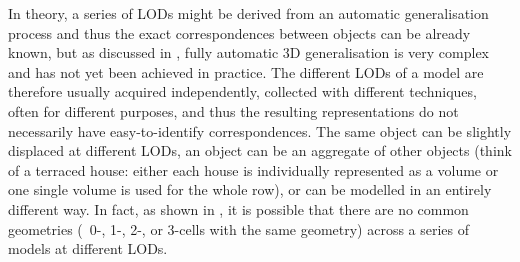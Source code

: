 In theory, a series of LODs might be derived from an automatic generalisation process \citep{Weibel97} and thus the exact correspondences between objects can be already known, but as discussed in , fully automatic 3D generalisation is very complex and has not yet been achieved in practice.
The different LODs of a model are therefore usually acquired independently, collected with different techniques, often for different purposes, and thus the resulting representations do not necessarily have easy-to-identify correspondences.
The same object can be slightly displaced at different LODs, an object can be an aggregate of other objects (think of a terraced house: either each house is individually represented as a volume or one single volume is used for the whole row), or can be modelled in an entirely different way.
In fact, as shown in , it is possible that there are no common geometries (\ie\ 0-, 1-, 2-, or 3-cells with the same geometry) across a series of models at different LODs.

